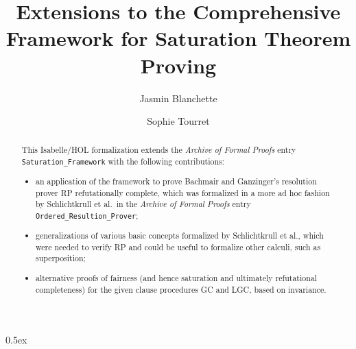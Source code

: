 \documentclass[11pt,a4paper]{article}
\begin{document}
\title{Extensions to the Comprehensive Framework for Saturation Theorem Proving}
\author{Jasmin Blanchette \and Sophie Tourret}
\maketitle

\begin{abstract}
\noindent
This Isabelle/HOL formalization extends the \emph{Archive of Formal Proofs}
entry \verb|Saturation_Framework| with the following contributions:

\begin{itemize}
\item an application of the framework to prove Bachmair and Ganzinger's
  resolution prover \textsf{RP} refutationally complete, which was formalized
  in a more ad hoc fashion by Schlichtkrull et al.\ in the
  \emph{Archive of Formal Proofs} entry \verb|Ordered_Resultion_Prover|;

\item generalizations of various basic concepts formalized by Schlichtkrull et
  al., which were needed to verify \textsf{RP} and could be useful to formalize
  other calculi, such as superposition;

\item alternative proofs of fairness (and hence saturation and ultimately
  refutational completeness) for the given clause procedures \textsf{GC} and
  \textsf{LGC}, based on invariance.
\end{itemize}
\end{abstract}

\tableofcontents

\parindent 0pt\parskip 0.5ex



%
%
\end{document}

